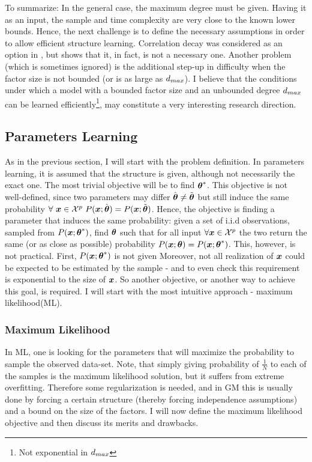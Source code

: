 To summarize: 
In the general case, the maximum degree must be given. Having it as an input, the sample and time complexity are very close to the known lower bounds. 
Hence, the next challenge is to define the necessary assumptions in order to allow efficient structure learning. 
Correlation decay was considered as an option in \cite{montanari2009graphical}, but \cite{bresler2014structure} shows that it, in fact, is not a necessary one. 
Another problem (which is sometimes ignored) is the additional step-up in difficulty when the factor size is not bounded (or is as large as $d_{max}$). 
I believe that the conditions under which a model with a bounded factor size and an unbounded degree $d_{max}$ can be learned efficiently\footnote{Not exponential in $d_{max}$}, may constitute a very interesting research direction.

\subsection{Parameters Learning}
As in the previous section, I will start with the problem definition. 
In parameters learning, it is assumed that the structure is given, although not necessarily the exact one.
The most trivial objective will be to find ${\boldsymbol{\theta}}^{*}$.  
This objective is not well-defined, since two parameters may differ $\hat{\boldsymbol{\theta}} \neq \tilde{\boldsymbol{\theta}}$ but still induce the same probability $\forall\ \xx \in \cX^p\ P(\xx;\hat{\thetav}) = P(\xx;\tilde{\thetav})$.
Hence, the objective is finding a parameter that induces the same probability: given a set of i.i.d observations, sampled from $P(\boldsymbol{x};{\boldsymbol{\theta}}^{*})$, find $\boldsymbol{\theta}$ such that for all input $\forall \boldsymbol{x} \in {\cal X}^{p}$ the two return the same (or as close as possible) probability $P(\boldsymbol{x};\boldsymbol{\theta}) = P(\boldsymbol{x};{\boldsymbol{\theta}}^{*})$.
This, however, is not practical.
First, $P(\boldsymbol{x};{\boldsymbol{\theta}}^{*})$ is not given
Moreover, not all realization of $\boldsymbol{x}$ could be expected to be estimated by the sample - and to even check this requirement is exponential to the size of $\boldsymbol{x}$.
So another objective, or another way to achieve this goal, is required.
I will start with the  most intuitive approach - maximum likelihood(ML).

\subsubsection{Maximum Likelihood}
\label{sec:max_likelihood}
In ML, one is looking for the parameters that will maximize the probability to sample the observed data-set.
Note, that simply giving probability of $\frac{1}{N}$ to each of the samples is the maximum likelihood solution, but it suffers from extreme overfitting.
Therefore some regularization is needed, and in GM this is usually done by forcing a certain structure (thereby forcing independence assumptions) and a bound on the size of the factors.
I will now define the maximum likelihood objective and then discuss its merits and drawbacks.

